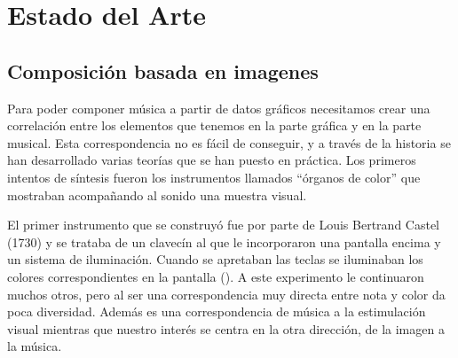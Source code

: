 \section{Estado del Arte}
\label{sec:estadodelarte}



\subsection{Composición basada en imagenes}


Para poder componer música a partir de datos gráficos necesitamos crear una correlación entre los elementos que tenemos en la parte gráfica y en la parte musical. Esta correspondencia no es fácil de conseguir, y a través de la historia se han desarrollado varias teorías que se han puesto en práctica. Los primeros intentos de síntesis fueron los instrumentos llamados ``órganos de color'' que mostraban acompañando al sonido una muestra visual.

El primer instrumento que se construyó fue por parte de Louis Bertrand Castel (1730) y se trataba de un clavecín al que le incorporaron una pantalla encima y un sistema de iluminación. Cuando se apretaban las teclas se iluminaban los colores correspondientes en la pantalla (\cite{organosColor}). \color{blue} A este experimento le continuaron muchos otros, pero al ser una correspondencia muy directa entre nota y color da poca diversidad. Además es una correspondencia de música a la estimulación visual mientras que nuestro interés se centra en la otra dirección, de la imagen a la música.\\ \color{black}

